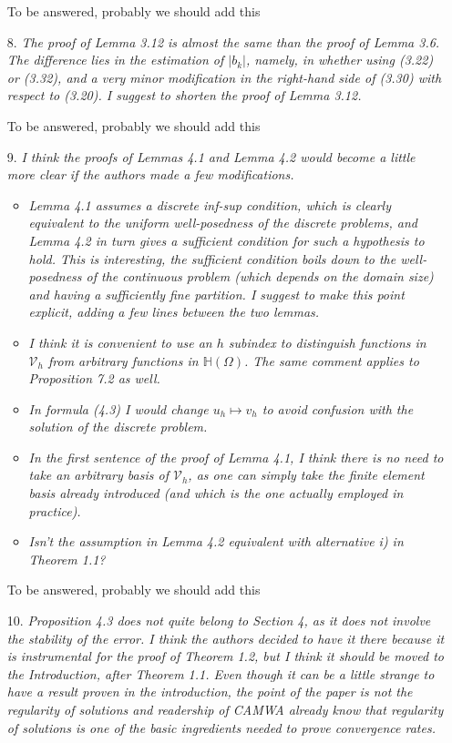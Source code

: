 \documentclass[11 pt]{article}
\numberwithin{equation}{section}
\begin{document}
\begin{enumerate}
    {\color{red}To be answered, probably we should add this}

    \item[8.] \emph{The proof of Lemma 3.12 is almost the same than the proof of Lemma 3.6. The difference lies in the estimation of \(|b_{k}|\), namely, in whether using (3.22) or (3.32), and a very minor modification in the right-hand side of (3.30) with respect to (3.20). I suggest to shorten the proof of Lemma 3.12.}

    {\color{red}To be answered, probably we should add this}

    \item[9.] \emph{I think the proofs of Lemmas 4.1 and Lemma 4.2 would become a little more clear if the authors made a few modifications.}
    \begin{itemize}
        \item \emph{Lemma 4.1 assumes a discrete inf-sup condition, which is clearly equivalent to the uniform well-posedness of the discrete problems, and Lemma 4.2 in turn gives a sufficient condition for such a hypothesis to hold. This is interesting, the sufficient condition boils down to the well-posedness of the continuous problem (which depends on the domain size) and having a sufficiently fine partition. I suggest to make this point explicit, adding a few lines between the two lemmas.}
        \item \emph{I think it is convenient to use an \(h\) subindex to distinguish functions in \({\mathcal{V}}_{h}\) from arbitrary functions in \(\mathbb{H}(\Omega)\). The same comment applies to Proposition 7.2 as well.}
        \item \emph{In formula (4.3) I would change \(u_{h}\mapsto v_{h}\) to avoid confusion with the solution of the discrete problem.}
        \item \emph{In the first sentence of the proof of Lemma 4.1, I think there is no need to take an arbitrary basis of \({\mathcal{V}}_{h}\), as one can simply take the finite element basis already introduced (and which is the one actually employed in practice).}
        \item \emph{Isn't the assumption in Lemma 4.2 equivalent with alternative i) in Theorem 1.1?}
    \end{itemize}

    {\color{red}To be answered, probably we should add this}

    \item[10.] \emph{Proposition 4.3 does not quite belong to Section 4, as it does not involve the stability of the error. I think the authors decided to have it there because it is instrumental for the proof of Theorem 1.2, but I think it should be moved to the Introduction, after Theorem 1.1. Even though it can be a little strange to have a result proven in the introduction, the point of the paper is not the regularity of solutions and readership of CAMWA already know that regularity of solutions is one of the basic ingredients needed to prove convergence rates.}


\end{enumerate}
\end{document}
